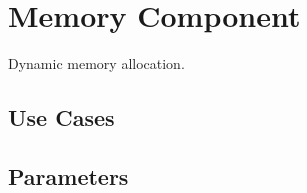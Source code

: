 \section{Memory Component} \label{s:component-memory}

Dynamic memory allocation.

\subsection{Use Cases}

\subsection{Parameters}



